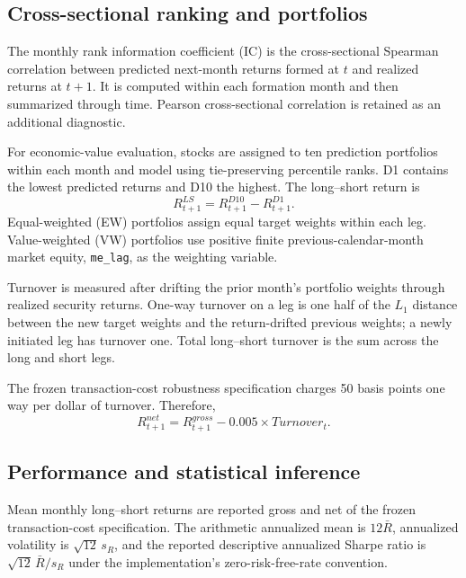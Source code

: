 \subsection{Cross-sectional ranking and portfolios}

The monthly rank information coefficient (IC) is the cross-sectional Spearman correlation between predicted next-month returns formed at $t$ and realized returns at $t+1$. It is computed within each formation month and then summarized through time. Pearson cross-sectional correlation is retained as an additional diagnostic.

For economic-value evaluation, stocks are assigned to ten prediction portfolios within each month and model using tie-preserving percentile ranks. D1 contains the lowest predicted returns and D10 the highest. The long--short return is
\begin{equation}
R^{LS}_{t+1}=R^{D10}_{t+1}-R^{D1}_{t+1}.
\end{equation}
Equal-weighted (EW) portfolios assign equal target weights within each leg. Value-weighted (VW) portfolios use positive finite previous-calendar-month market equity, \texttt{me\_lag}, as the weighting variable.

Turnover is measured after drifting the prior month's portfolio weights through realized security returns. One-way turnover on a leg is one half of the $L_1$ distance between the new target weights and the return-drifted previous weights; a newly initiated leg has turnover one. Total long--short turnover is the sum across the long and short legs.

The frozen transaction-cost robustness specification charges 50 basis points one way per dollar of turnover. Therefore,
\begin{equation}
R^{net}_{t+1}=R^{gross}_{t+1}-0.005\times Turnover_{t}.
\end{equation}

\subsection{Performance and statistical inference}

Mean monthly long--short returns are reported gross and net of the frozen transaction-cost specification. The arithmetic annualized mean is $12\bar R$, annualized volatility is $\sqrt{12}\,s_R$, and the reported descriptive annualized Sharpe ratio is $\sqrt{12}\,\bar R/s_R$ under the implementation's zero-risk-free-rate convention.

